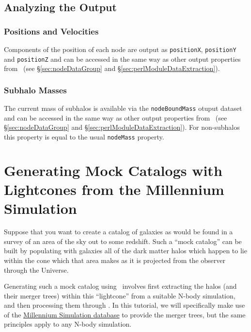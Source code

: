 \subsection{Analyzing the Output}

\subsubsection{Positions and Velocities}

Components of the position of each node are output as {\tt positionX}, {\tt positionY} and {\tt positionZ} and can be accessed in the same way as other output properties from \glc\ (see \S\ref{sec:nodeDataGroup} and \S\ref{sec:perlModuleDataExtraction}).

\subsubsection{Subhalo Masses}

The current mass of subhalos is available via the {\tt nodeBoundMass} otuput dataset and can be accessed in the same way as other output properties from \glc\ (see \S\ref{sec:nodeDataGroup} and \S\ref{sec:perlModuleDataExtraction}). For non-subhalos this property is equal to the usual {\tt nodeMass} property.

\section{Generating Mock Catalogs with Lightcones from the Millennium Simulation}

Suppose that you want to create a catalog of galaxies as would be found in a survey of an area of the sky out to some redshift. Such a ``mock catalog'' can be built by populating with galaxies all of the dark matter halos which happen to lie within the cone which that area makes as it is projected from the observer through the Universe.

Generating such a mock catalog using \glc\ involves first extracting the halos (and their merger trees) within this ``lightcone'' from a suitable N-body simulation, and then processing them through \glc. In this tutorial, we will specifically make use of the \href{http://gavo.mpa-garching.mpg.de/MyMillennium3/MyDB}{Millennium Simulation database} to provide the merger trees, but the same principles apply to any N-body simulation.

